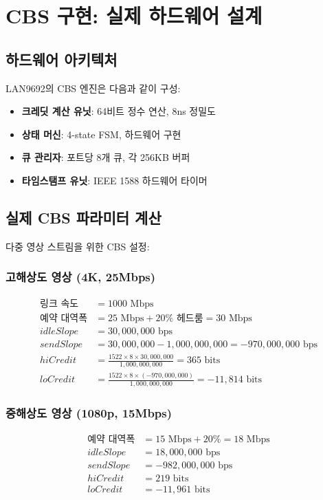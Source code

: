 \documentclass[twocolumn,10pt]{article}
\begin{document}
\section{CBS 구현: 실제 하드웨어 설계}
\label{sec:implementation}

\subsection{하드웨어 아키텍처}

LAN9692의 CBS 엔진은 다음과 같이 구성:

\begin{itemize}
    \item \textbf{크레딧 계산 유닛}: 64비트 정수 연산, 8ns 정밀도
    \item \textbf{상태 머신}: 4-state FSM, 하드웨어 구현
    \item \textbf{큐 관리자}: 포트당 8개 큐, 각 256KB 버퍼
    \item \textbf{타임스탬프 유닛}: IEEE 1588 하드웨어 타이머
\end{itemize}

\subsection{실제 CBS 파라미터 계산}

다중 영상 스트림을 위한 CBS 설정:

\subsubsection{고해상도 영상 (4K, 25Mbps)}
\begin{align}
\text{링크 속도} &= 1000 \text{ Mbps} \\
\text{예약 대역폭} &= 25 \text{ Mbps} + 20\% \text{ 헤드룸} = 30 \text{ Mbps} \\
idleSlope &= 30,000,000 \text{ bps} \\
sendSlope &= 30,000,000 - 1,000,000,000 = -970,000,000 \text{ bps} \\
hiCredit &= \frac{1522 \times 8 \times 30,000,000}{1,000,000,000} = 365 \text{ bits} \\
loCredit &= \frac{1522 \times 8 \times (-970,000,000)}{1,000,000,000} = -11,814 \text{ bits}
\end{align}

\subsubsection{중해상도 영상 (1080p, 15Mbps)}
\begin{align}
\text{예약 대역폭} &= 15 \text{ Mbps} + 20\% = 18 \text{ Mbps} \\
idleSlope &= 18,000,000 \text{ bps} \\
sendSlope &= -982,000,000 \text{ bps} \\
hiCredit &= 219 \text{ bits} \\
loCredit &= -11,961 \text{ bits}
\end{align}
\end{document}
